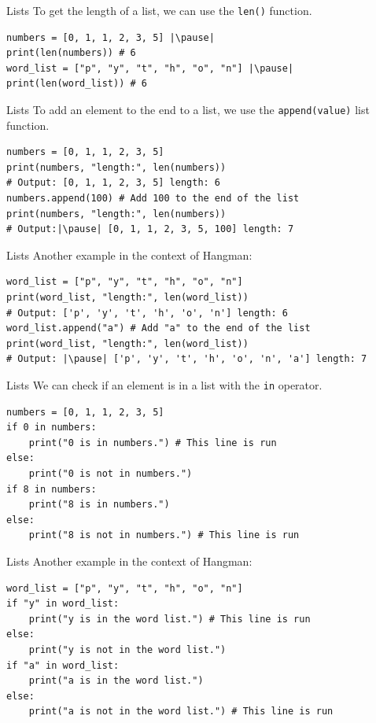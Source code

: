 \documentclass[dvipsnames, svgnames, x11names, handout]{beamer}
\begin{document}
\begin{frame}[fragile]{Lists}
To get the length of a list, we can use the \texttt{len()} function. \pause
\begin{verbatim}
numbers = [0, 1, 1, 2, 3, 5] |\pause|
print(len(numbers)) # 6 
word_list = ["p", "y", "t", "h", "o", "n"] |\pause|
print(len(word_list)) # 6
\end{verbatim}
\end{frame}

\begin{frame}[fragile]{Lists}
To add an element to the end to a list, we use the \texttt{append(value)} list function. \pause
\begin{verbatim}
numbers = [0, 1, 1, 2, 3, 5]
print(numbers, "length:", len(numbers)) 
# Output: [0, 1, 1, 2, 3, 5] length: 6
numbers.append(100) # Add 100 to the end of the list
print(numbers, "length:", len(numbers))
# Output:|\pause| [0, 1, 1, 2, 3, 5, 100] length: 7
\end{verbatim}
\end{frame}

\begin{frame}[fragile]{Lists}
Another example in the context of Hangman:
\begin{verbatim}
word_list = ["p", "y", "t", "h", "o", "n"]
print(word_list, "length:", len(word_list)) 
# Output: ['p', 'y', 't', 'h', 'o', 'n'] length: 6
word_list.append("a") # Add "a" to the end of the list
print(word_list, "length:", len(word_list))  
# Output: |\pause| ['p', 'y', 't', 'h', 'o', 'n', 'a'] length: 7
\end{verbatim}
\end{frame}

\begin{frame}[fragile]{Lists}
We can check if an element is in a list with the \texttt{in} operator.\pause

\begin{verbatim}
numbers = [0, 1, 1, 2, 3, 5]
if 0 in numbers:
    print("0 is in numbers.") # This line is run
else:
    print("0 is not in numbers.")
if 8 in numbers:
    print("8 is in numbers.")
else:
    print("8 is not in numbers.") # This line is run
\end{verbatim}
\end{frame}

\begin{frame}[fragile]{Lists}
Another example in the context of Hangman:
    
\begin{verbatim}
word_list = ["p", "y", "t", "h", "o", "n"]
if "y" in word_list:
    print("y is in the word list.") # This line is run
else:
    print("y is not in the word list.")
if "a" in word_list:
    print("a is in the word list.")
else:
    print("a is not in the word list.") # This line is run
\end{verbatim}
\end{frame}
\end{document}
